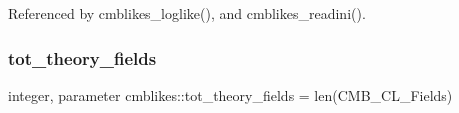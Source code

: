 Referenced by cmblikes\+\_\+loglike(), and cmblikes\+\_\+readini().

\mbox{\label{namespacecmblikes_a9a7a0c55bde53b41f76027a48c8eb811}} 
\subsubsection{\texorpdfstring{tot\+\_\+theory\+\_\+fields}{tot\_theory\_fields}}
{\footnotesize\ttfamily integer, parameter cmblikes\+::tot\+\_\+theory\+\_\+fields = len(C\+M\+B\+\_\+\+C\+L\+\_\+\+Fields)\hspace{0.3cm}{\ttfamily [private]}}

